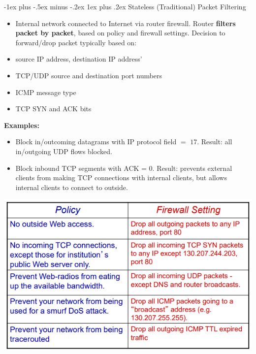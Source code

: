 \documentclass[12pt, landscape]{article}
\makeatletter
\renewcommand{\subsubsection}{\@startsection{subsubsection}{3}{0.1mm}%
                                {-1ex plus -.5ex minus -.2ex}%
                                {1ex plus .2ex}%
                                {\normalfont\small\bfseries}}
\makeatother
\begin{document}
\begin{multicols*}{3}
\subsubsection{Stateless (Traditional) Packet Filtering}
\begin{itemize}
\item Internal network connected to Internet via router firewall. Router \textbf{filters packet by packet}, based on policy and firewall settings. Decision to forward/drop packet typically based on:
\item source IP address, destination IP address'
\item  TCP/UDP source and destination port numbers
\item ICMP message type
\item TCP SYN and ACK bits
\end{itemize}
\smallskip
\textbf{Examples:}
\begin{itemize}
\item Block in/outcoming datagrams with IP protocol field $=$ $17$. Result: all in/outgoing UDP flows blocked.
\item Block inbound TCP segments with ACK = 0. Result: prevents external clients from making TCP connections with internal clients, but allows internal clients to connect to outside.
\end{itemize}
\centerline{\includegraphics[width=0.8\linewidth]{statelesspacketfilter}}


\end{multicols*}
\end{document}
